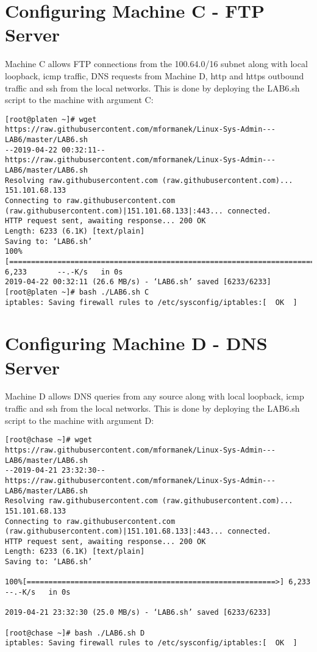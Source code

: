 \documentclass[11pt,onside]{article}
\begin{document}
\section{Configuring Machine C - FTP Server}
Machine C allows FTP connections from the 100.64.0/16 subnet along with local loopback, icmp traffic, DNS requests from Machine D, http and https outbound traffic and ssh from the local networks. This is done by deploying the LAB6.sh script to the machine with argument C:
\begin{lstlisting}
[root@platen ~]# wget https://raw.githubusercontent.com/mformanek/Linux-Sys-Admin---LAB6/master/LAB6.sh
--2019-04-22 00:32:11--  https://raw.githubusercontent.com/mformanek/Linux-Sys-Admin---LAB6/master/LAB6.sh
Resolving raw.githubusercontent.com (raw.githubusercontent.com)... 151.101.68.133
Connecting to raw.githubusercontent.com (raw.githubusercontent.com)|151.101.68.133|:443... connected.
HTTP request sent, awaiting response... 200 OK
Length: 6233 (6.1K) [text/plain]
Saving to: ‘LAB6.sh’
100%[============================================================================>] 6,233       --.-K/s   in 0s
2019-04-22 00:32:11 (26.6 MB/s) - ‘LAB6.sh’ saved [6233/6233]
[root@platen ~]# bash ./LAB6.sh C
iptables: Saving firewall rules to /etc/sysconfig/iptables:[  OK  ]
\end{lstlisting}
\section{Configuring Machine D - DNS Server}
Machine D allows DNS queries from any source along with local loopback, icmp traffic and ssh from the local networks. This is done by deploying the LAB6.sh script to the machine with argument D:
\begin{lstlisting}
[root@chase ~]# wget https://raw.githubusercontent.com/mformanek/Linux-Sys-Admin---LAB6/master/LAB6.sh
--2019-04-21 23:32:30--  https://raw.githubusercontent.com/mformanek/Linux-Sys-Admin---LAB6/master/LAB6.sh
Resolving raw.githubusercontent.com (raw.githubusercontent.com)... 151.101.68.133
Connecting to raw.githubusercontent.com (raw.githubusercontent.com)|151.101.68.133|:443... connected.
HTTP request sent, awaiting response... 200 OK
Length: 6233 (6.1K) [text/plain]
Saving to: ‘LAB6.sh’

100%[=========================================================>] 6,233       --.-K/s   in 0s

2019-04-21 23:32:30 (25.0 MB/s) - ‘LAB6.sh’ saved [6233/6233]

[root@chase ~]# bash ./LAB6.sh D
iptables: Saving firewall rules to /etc/sysconfig/iptables:[  OK  ]
\end{lstlisting}
\end{document}
